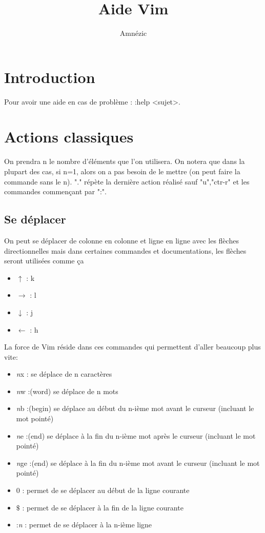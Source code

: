 \documentclass{article}
\author{Amnézic}
\date{}
\title{Aide Vim}
\begin{document}
\maketitle
\newpage
\tableofcontents
\newpage
\section{Introduction}
Pour avoir une aide en cas de problème : :help <sujet>.












\section{Actions classiques}
On prendra n le nombre d'éléments que l'on utilisera. On notera que dans la plupart des cas, si n=1, alors on a pas besoin de le mettre (on peut faire la commande sans le n). "." répète la dernière action réalisé sauf "u","ctr-r" et les commandes commençant par ":".








\subsection{Se déplacer}
On peut se déplacer de colonne en colonne et ligne en ligne avec les flèches directionnelles mais dans certaines commandes et documentations, les flèches seront utilisées comme ça
\begin{itemize}
    \item $\uparrow$ : k
    \item $\rightarrow$ : l
    \item $\downarrow$ : j
    \item $\leftarrow$ : h
\end{itemize}
La force de Vim réside dans ces commandes qui permettent d'aller beaucoup plus vite:
\begin{itemize}
    \item \textit{n}x : se déplace de n caractères
    \item \textit{n}w :(word) se déplace de n mots
    \item \textit{n}b :(begin) se déplace au début du n-ième mot avant le curseur (incluant le mot pointé)
    \item \textit{n}e :(end) se déplace à la fin du n-ième mot après le curseur (incluant le mot pointé)
    \item \textit{n}ge :(end) se déplace à la fin du n-ième mot avant le curseur (incluant le mot pointé)
    \item 0 : permet de se déplacer au début de la ligne courante
    \item $\$$ : permet de se déplacer à la fin de la ligne courante
    \item :\textit{n} : permet de se déplacer à la n-ième ligne
\end{itemize}
\end{document}
